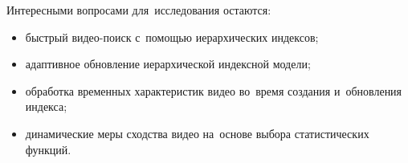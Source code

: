 Интересными вопросами для~исследования остаются:
\begin{itemize}
    \item быстрый видео-поиск с~помощью иерархических индексов;
    \item адаптивное обновление иерархической индексной модели;
    \item обработка временных характеристик видео во~время создания и~обновления индекса;
    \item динамические меры сходства видео на~основе выбора статистических функций.
\end{itemize}

